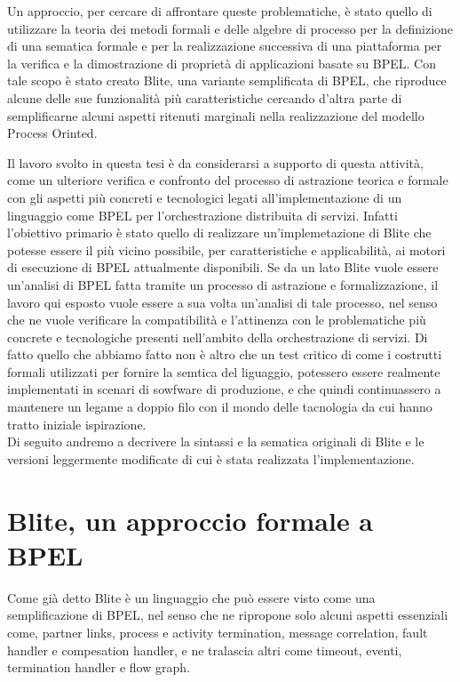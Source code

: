 Un approccio, per cercare di affrontare queste problematiche, è stato quello di
utilizzare la teoria dei metodi formali e delle algebre di processo per la
definizione di una sematica formale e per la realizzazione successiva di una
piattaforma per la verifica e la dimostrazione di proprietà di applicazioni
basate su BPEL. Con tale scopo è stato creato Blite, una variante semplificata di
BPEL, che riproduce alcune delle sue funzionalità più caratteristiche cercando
d'altra parte di semplificarne alcuni aspetti ritenuti marginali nella
realizzazione del modello Process Orinted.
   
Il lavoro svolto in questa tesi è da considerarsi a supporto di questa attività,
come un ulteriore verifica e confronto del processo di astrazione teorica e
formale con gli aspetti più concreti e tecnologici legati all'implementazione di
un linguaggio come BPEL per l'orchestrazione distribuita di servizi. Infatti
l'obiettivo primario è stato quello di realizzare un'implemetazione di Blite che
potesse essere il più vicino possibile, per caratteristiche e applicabilità, ai
motori di esecuzione di BPEL attualmente disponibili. Se da un lato Blite vuole
essere un'analisi di BPEL fatta tramite un processo di astrazione e
formalizzazione, il lavoro qui esposto vuole essere a sua volta un'analisi di
tale processo, nel senso che ne vuole verificare la compatibilità e l'attinenza
con le problematiche più concrete e tecnologiche presenti nell'ambito della
orchestrazione di servizi. Di fatto quello che abbiamo fatto non è altro che un
test critico di come i costrutti formali utilizzati per fornire la semtica del
liguaggio, potessero essere realmente implementati in scenari di sowfware di
produzione, e che quindi continuassero a mantenere un legame a doppio filo con
il mondo delle tacnologia da cui hanno tratto iniziale ispirazione.
\\

Di seguito andremo a decrivere la sintassi e  la sematica originali di Blite e
le versioni leggermente modificate di cui è stata realizzata l'implementazione.

\section{Blite, un approccio formale a BPEL}

Come già detto Blite è un linguaggio che può essere visto come una
semplificazione di BPEL, nel senso che ne ripropone solo alcuni aspetti
essenziali come, partner links, process e activity termination, message
correlation, fault handler e compesation handler, e ne tralascia altri come
timeout, eventi, termination handler e flow graph.

